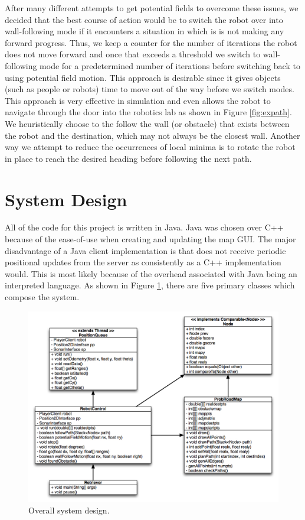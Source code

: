 \documentclass[12pt]{article}
\begin{document}
After many different attempts to get potential fields to overcome these issues, we decided that the best course of action would be to switch the robot over into wall-following mode if it encounters a situation in which is is not making any forward progress. Thus, we keep a counter for the number of iterations the robot does not move forward and once that exceeds a threshold we switch to wall-following mode for a predetermined number of iterations before switching back to using potential field motion. This approach is desirable since it gives objects (such as people or robots) time to move out of the way before we switch modes. This approach is very effective in simulation and even allows the robot to navigate through the door into the robotics lab as shown in Figure \ref{fig:expath}. We heuristically choose to the follow the wall (or obstacle) that exists between the robot and the destination, which may not always be the closest wall. Another way we attempt to reduce the occurrences of local minima is to rotate the robot in place to reach the desired heading before following the next path.


\section{System Design}

All of the code for this project is written in Java. Java was chosen over C++ because of the ease-of-use when creating and updating the map GUI. The major disadvantage of a Java client implementation is that does not receive periodic positional updates from the server as consistently as a C++ implementation would. This is most likely because of the overhead associated with Java being an interpreted language. As shown in Figure \ref{fig:uml}, there are five primary classes which compose the system.
 

\begin{figure}[H]
\centering
\includegraphics[scale=.6]{img/UML.jpg}
\caption{Overall system design.}
\label{fig:uml}
\end{figure}
\end{document}
